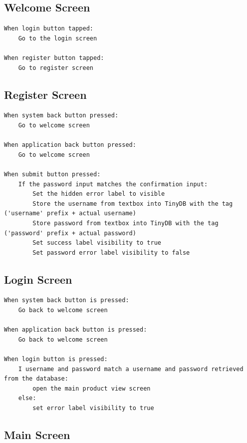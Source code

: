 \documentclass{scrreprt}
\begin{document}
\subsection*{Welcome Screen}

\begin{lstlisting}
When login button tapped:
    Go to the login screen
    
When register button tapped:
    Go to register screen
\end{lstlisting}

\subsection*{Register Screen}

\begin{lstlisting}
When system back button pressed:
    Go to welcome screen
    
When application back button pressed:
    Go to welcome screen

When submit button pressed:
    If the password input matches the confirmation input:
        Set the hidden error label to visible
        Store the username from textbox into TinyDB with the tag ('username' prefix + actual username)
        Store password from textbox into TinyDB with the tag ('password' prefix + actual password)
        Set success label visibility to true
        Set password error label visibility to false
\end{lstlisting}

\subsection*{Login Screen}

\begin{lstlisting}
When system back button is pressed:
    Go back to welcome screen
    
When application back button is pressed:
    Go back to welcome screen
    
When login button is pressed:
    I username and password match a username and password retrieved from the database:
        open the main product view screen
    else:
        set error label visibility to true
\end{lstlisting}

\subsection*{Main Screen}
\end{document}

